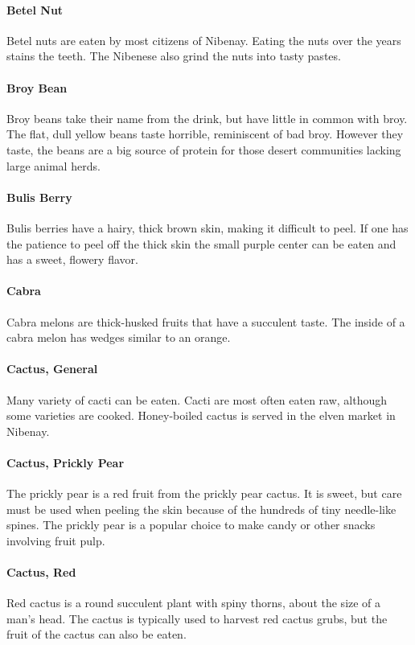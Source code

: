\begin{multicols}{2}
\paragraph{Betel Nut} Betel nuts are eaten by most citizens of Nibenay. Eating the nuts over the years stains the teeth. The Nibenese also grind the nuts into tasty pastes.\\
\paragraph{Broy Bean} Broy beans take their name from the drink, but have little in common with broy. The flat, dull yellow beans taste horrible, reminiscent of bad broy. However they taste, the beans are a big source of protein for those desert communities lacking large animal herds.\\
\paragraph{Bulis Berry} Bulis berries have a hairy, thick brown skin, making it difficult to peel. If one has the patience to peel off the thick skin the small purple center can be eaten and has a sweet, flowery flavor.\\
\paragraph{Cabra} Cabra melons are thick-husked fruits that have a succulent taste. The inside of a cabra melon has wedges similar to an orange.\\
\paragraph{Cactus, General} Many variety of cacti can be eaten. Cacti are most often eaten raw, although some varieties are cooked. Honey-boiled cactus is served in the elven market in Nibenay.\\
\paragraph{Cactus, Prickly Pear} The prickly pear is a red fruit from the prickly pear cactus. It is sweet, but care must be used when peeling the skin because of the hundreds of tiny needle-like spines. The prickly pear is a popular choice to make candy or other snacks involving fruit pulp.\\
\paragraph{Cactus, Red} Red cactus is a round succulent plant with spiny thorns, about the size of a man's head. The cactus is typically used to harvest red cactus grubs, but the fruit of the cactus can also be eaten.\\

\end{multicols}
